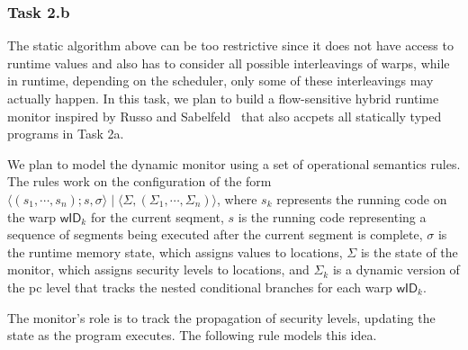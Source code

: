 \subsubsection{Task 2.b} 
The static algorithm above can be too restrictive since it does not have access to runtime values and also has to consider all possible interleavings of warps, while in runtime, depending on the scheduler, only some of these interleavings may actually happen. 
%
In this task, we plan to build a flow-sensitive hybrid runtime monitor inspired by Russo and Sabelfeld~\cite{russo2010CSF}
that also accpets all statically typed programs in Task 2a.
%

We plan to model the dynamic monitor using a set of operational semantics rules.
%
The rules work on the configuration of the form $\langle (s_1, \cdots, s_n); s, \sigma \rangle  \mid \langle \Sigma, (\Sigma_1, \cdots, \Sigma_n)\rangle$, where $s_k$ represents the running code on the warp $\mathsf{wID}_k$ for the current seqment, $s$ is the running code representing a sequence of segments being executed after the current segment is complete, $\sigma$ is the runtime memory state, which assigns values to locations,  $\Sigma $ is the state of the monitor, which  assigns security levels to locations, 
and $\Sigma_k$ is a dynamic version of the pc level that tracks the nested conditional branches for each warp $\mathsf{wID}_k$.
%

The monitor's role is to track the propagation of security levels, updating the state as the program executes.
%
The following rule models this idea.


